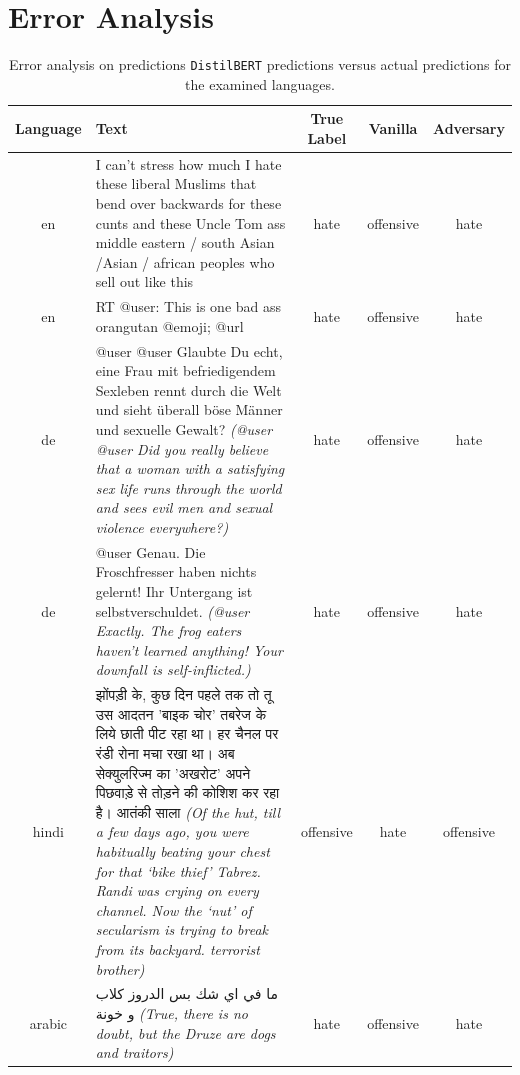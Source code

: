 \documentclass[11pt]{article}
\begin{document}
	\section{Error Analysis}
	
	\begin{table}[h!]
		\small
		\centering
		\begin{tabular}{|c|p{7.4cm}|c|c|c|}
			\hline Language & Text & True Label & Vanilla & Adversary\\ \hline
			en &  I can’t stress how much I hate these liberal Muslims that bend over backwards for these cunts and these Uncle Tom ass middle eastern / south Asian /Asian / african peoples who sell out like this & hate & offensive & hate\\\hline
			en & RT @user: This is one bad ass orangutan @emoji; @url & hate & offensive & hate\\\hline
			de & @user @user Glaubte Du echt, eine Frau mit befriedigendem Sexleben rennt durch die Welt und sieht überall böse Männer und sexuelle Gewalt? \textit{(@user @user Did you really believe that a woman with a satisfying sex life runs through the world and sees evil men and sexual violence everywhere?)}  & hate & offensive & hate\\\hline
			de & @user Genau. Die Froschfresser haben nichts gelernt! Ihr Untergang ist selbstverschuldet. \textit{(@user Exactly. The frog eaters haven't learned anything! Your downfall is self-inflicted.)} & hate & offensive & hate\\\hline
			hindi& {\hindifont झोंपड़ी के, कुछ दिन पहले तक तो तू उस आदतन 'बाइक चोर' तबरेज के लिये छाती पीट रहा था। हर चैनल पर रंडी रोना मचा रखा था। अब सेक्युलरिज्म का 'अखरोट' अपने पिछवाड़े से तोड़ने की कोशिश कर रहा है। आतंकी साला} \textit{(Of the hut, till a few days ago, you were habitually beating your chest for that `bike thief' Tabrez. Randi was crying on every channel. Now the `nut' of secularism is trying to break from its backyard. terrorist brother)} & offensive & hate & offensive\\\hline
			arabic& {\arabicfont  ما في اي شك بس الدروز كلاب و خونة} \textit{(True, there is no doubt, but the Druze are dogs and traitors)} & hate & offensive & hate\\\hline
		\end{tabular}
		\caption{Error analysis on predictions \texttt{DistilBERT} predictions versus actual predictions for the examined languages.\label{error_analysis}}
	\end{table}
	
\end{document}
